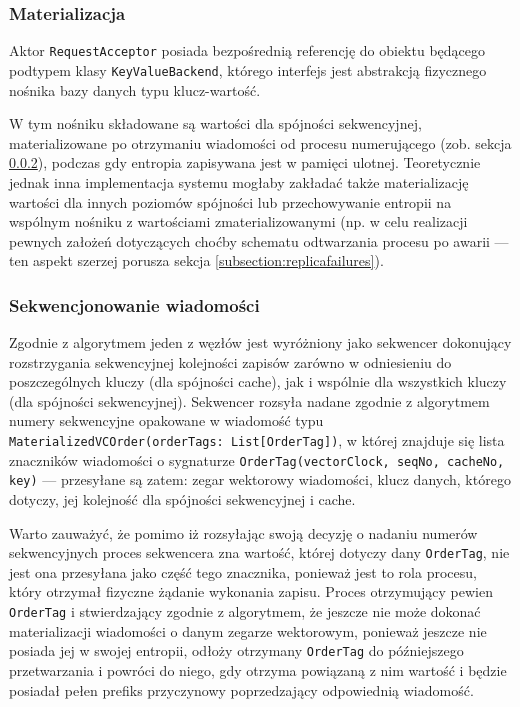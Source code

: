\subsubsection{Materializacja}

Aktor \texttt{RequestAcceptor} posiada bezpośrednią referencję do obiektu będącego podtypem klasy \texttt{KeyValueBackend}, którego interfejs jest abstrakcją fizycznego nośnika bazy danych typu klucz-wartość.

W tym nośniku składowane są wartości dla spójności sekwencyjnej, materializowane po otrzymaniu wiadomości od procesu numerującego (zob. sekcja \ref{subsubsection:sequencingimpl}), podczas gdy entropia zapisywana jest w pamięci ulotnej. Teoretycznie jednak inna implementacja systemu mogłaby zakładać także materializację wartości dla innych poziomów spójności lub przechowywanie entropii na wspólnym nośniku z wartościami zmaterializowanymi (np. w celu realizacji pewnych założeń dotyczących choćby schematu odtwarzania procesu po awarii --- ten aspekt szerzej porusza sekcja \ref{subsection:replicafailures}).

\subsubsection{Sekwencjonowanie wiadomości} \label{subsubsection:sequencingimpl}

Zgodnie z algorytmem jeden z węzłów jest wyróżniony jako sekwencer dokonujący rozstrzygania sekwencyjnej kolejności zapisów zarówno w odniesieniu do poszczególnych kluczy (dla spójności cache), jak i wspólnie dla wszystkich kluczy (dla spójności sekwencyjnej). Sekwencer rozsyła nadane zgodnie z algorytmem numery sekwencyjne opakowane w wiadomość typu \texttt{MaterializedVCOrder(orderTags: List[OrderTag])}, w której znajduje się lista znaczników wiadomości o sygnaturze \texttt{OrderTag(vectorClock, seqNo, cacheNo, key)} --- przesyłane są zatem: zegar wektorowy wiadomości, klucz danych, którego dotyczy, jej kolejność dla spójności sekwencyjnej i cache.

Warto zauważyć, że pomimo iż rozsyłając swoją decyzję o nadaniu numerów sekwencyjnych proces sekwencera zna wartość, której dotyczy dany \texttt{OrderTag}, nie jest ona przesyłana jako część tego znacznika, ponieważ jest to rola procesu, który otrzymał fizyczne żądanie wykonania zapisu. Proces otrzymujący pewien \texttt{OrderTag} i stwierdzający zgodnie z algorytmem, że jeszcze nie może dokonać materializacji wiadomości o danym zegarze wektorowym, ponieważ jeszcze nie posiada jej w swojej entropii, odłoży otrzymany \texttt{OrderTag} do późniejszego przetwarzania i powróci do niego, gdy otrzyma powiązaną z nim wartość i będzie posiadał pełen prefiks przyczynowy poprzedzający odpowiednią wiadomość.

